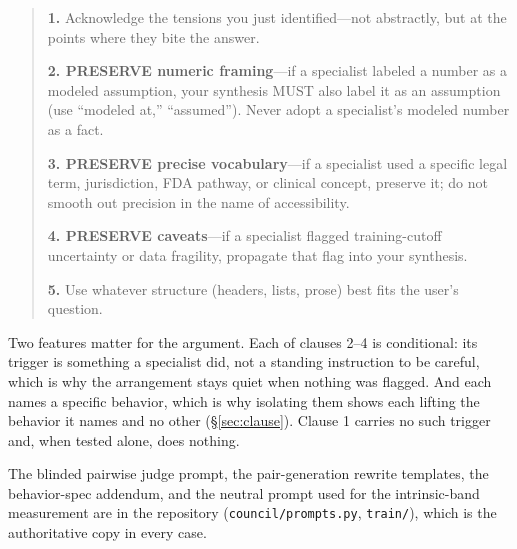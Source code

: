 \documentclass[11pt]{article}
\begin{document}
\begin{quote}\small
\textbf{1.} Acknowledge the tensions you just identified---not abstractly, but
at the points where they bite the answer.

\textbf{2. PRESERVE numeric framing}---if a specialist labeled a number as a
modeled assumption, your synthesis MUST also label it as an assumption (use
``modeled at,'' ``assumed''). Never adopt a specialist's modeled number as a
fact.

\textbf{3. PRESERVE precise vocabulary}---if a specialist used a specific legal
term, jurisdiction, FDA pathway, or clinical concept, preserve it; do not
smooth out precision in the name of accessibility.

\textbf{4. PRESERVE caveats}---if a specialist flagged training-cutoff
uncertainty or data fragility, propagate that flag into your synthesis.

\textbf{5.} Use whatever structure (headers, lists, prose) best fits the
user's question.
\end{quote}

Two features matter for the argument. Each of clauses 2--4 is conditional:
its trigger is something a specialist did, not a standing instruction to be
careful, which is why the arrangement stays quiet when nothing was flagged.
And each names a specific behavior, which is why isolating them shows each
lifting the behavior it names and no other (\S\ref{sec:clause}). Clause 1
carries no such trigger and, when tested alone, does nothing.

The blinded pairwise judge prompt, the pair-generation rewrite templates, the
behavior-spec addendum, and the neutral prompt used for the intrinsic-band
measurement are in the repository (\texttt{council/prompts.py},
\texttt{train/}), which is the authoritative copy in every case.
\end{document}
